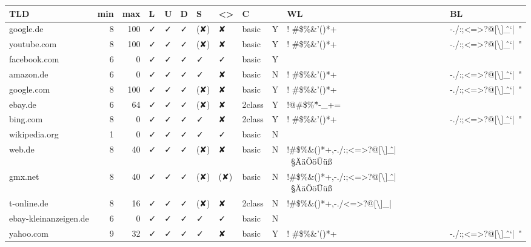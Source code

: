 {\footnotesize
\begin{longtable}{lrrlllllllp{1cm}p{1cm}}
		TLD   & \multicolumn{1}{l}{min} & \multicolumn{1}{l}{max} & L & U & D & S & <> & C & \emoji{1F4D6} & \multicolumn{1}{l}{WL} & \multicolumn{1}{l}{BL} \\ \hline
		\endhead
		google.de & 8     & 100   & ✓ & ✓ & ✓ & (✘) & ✘ & basic & Y     & \multicolumn{1}{l}{! \#\$\%\&'()*+} & \multicolumn{1}{l}{-./:;<=>?@[\textbackslash{}]\^\_`{|}~"} \\
		youtube.com & 8     & 100   & ✓ & ✓ & ✓ & (✘) & ✘ & basic & Y     & \multicolumn{1}{l}{! \#\$\%\&'()*+} & \multicolumn{1}{l}{-./:;<=>?@[\textbackslash{}]\^\_`{|}~"} \\
		facebook.com & 6     & 0     & ✓ & ✓ & ✓ & ✓ & ✓ & basic & Y     &       &  \\
		amazon.de & 6     & 0     & ✓ & ✓ & ✓ & ✓ & ✘ & basic & N     & \multicolumn{1}{l}{! \#\$\%\&'()*+} & \multicolumn{1}{l}{-./:;<=>?@[\textbackslash{}]\^\_`{|}~"} \\
		google.com & 8     & 100   & ✓ & ✓ & ✓ & (✘) & ✘ & basic & Y     & \multicolumn{1}{l}{! \#\$\%\&'()*+} & \multicolumn{1}{l}{-./:;<=>?@[\textbackslash{}]\^\_`{|}~"} \\
		ebay.de & 6     & 64    & ✓ & ✓ & ✓ & (✘) & ✘ & 2class & Y     & \multicolumn{1}{l}{!@\#\$\%\^*-\_+=} &  \\
		bing.com & 8     & 0     & ✓ & ✓ & ✓ & ✓ & ✘ & 2class & Y     & \multicolumn{1}{l}{! \#\$\%\&'()*+} & \multicolumn{1}{l}{-./:;<=>?@[\textbackslash{}]\^\_`{|}~"} \\
		wikipedia.org & 1     & 0     & ✓ & ✓ & ✓ & ✓ & ✓ & basic & N     &       &  \\
		web.de & 8     & 40    & ✓ & ✓ & ✓ & (✘) & ✘ & basic & N     & \multicolumn{1}{l}{!\#\$\%\&()*+,-./:;<=>?@[\textbackslash{}]\^\_{|}~§ÄäÖöÜüß} &  \\
		gmx.net & 8     & 40    & ✓ & ✓ & ✓ & (✘) & (✘) & basic & N     & \multicolumn{1}{l}{ !\#\$\%\&()*+,-./:;<=>?@[\textbackslash{}]\^\_{|}~§ÄäÖöÜüß} &  \\
		t-online.de & 8     & 16    & ✓ & ✓ & ✓ & (✘) & ✘ & 2class & N     & \multicolumn{1}{l}{!\#\$\%\&()*+,-./<=>?@[\textbackslash{}]\_{|}~} &  \\
		ebay-kleinanzeigen.de & 6     & 0     & ✓ & ✓ & ✓ & ✓ & ✓ & basic & N     &       &  \\
		yahoo.com & 9     & 32    & ✓ & ✓ & ✓ & ✓ & ✘ & basic & Y     & \multicolumn{1}{l}{! \#\$\%\&'()*+} & \multicolumn{1}{l}{-./:;<=>?@[\textbackslash{}]\^\_`{|}~"} \\

\end{longtable}}
